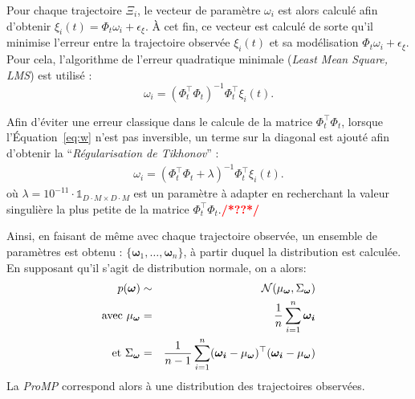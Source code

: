 \documentclass[utf8]{frontiersSCNS} %
\newcommand{\todo}[1]{\textcolor{red}{\textbf{/*#1*/}}}
\begin{document}
Pour chaque trajectoire $\Xi_i$, le vecteur de paramètre $\omega_i$ est alors calculé afin d'obtenir $\xi_i(t) = \Phi_t \omega_i + \epsilon_\xi$. À cet fin, ce vecteur est calculé de sorte qu'il minimise l'erreur entre la trajectoire observée $\xi_i(t)$ et sa modélisation $\Phi_t \omega_i + \epsilon_\xi$. Pour cela, l'algorithme de l'erreur quadratique minimale (\textit{Least Mean Square, LMS}) est utilisé :
\begin{equation} \label{eq:w}
\omega_i = (\Phi_t^\top\Phi_t)^{-1}\Phi_t^\top \xi_i(t).
\end{equation} 

Afin d'éviter une erreur classique dans le calcule de la matrice $\Phi_t^\top\Phi_t$, lorsque l'Équation~\ref{eq:w} n'est pas inversible, un terme sur la diagonal est ajouté afin d'obtenir la ``\textit{Régularisation de Tikhonov}'' :
\begin{eqnarray} \label{eq:wInvertible}
\omega_i = (\Phi_t^\top\Phi_t + \lambda)^{-1}\Phi_t^\top \xi_i(t).
\end{eqnarray} 
où $\lambda=10^{-11} \cdot \mathds{1}_{ D\cdot M \times D\cdot M} $ est un paramètre à adapter en recherchant la valeur singulière la plus petite de la matrice $\Phi_t^\top\Phi_t$.\todo{??}


Ainsi, en faisant de même avec chaque trajectoire observée, un ensemble de paramètres est obtenu : $\{\boldsymbol{\omega}_1,\ldots, \boldsymbol{\omega}_n\}$, à partir duquel la distribution est calculée. En supposant qu'il s'agit de distribution normale, on a alors:
\begin{eqnarray}
p(\boldsymbol{\omega}) & \sim & \mathcal{N}(\mu_{\boldsymbol{\omega}}, \Sigma_{\boldsymbol{\omega}})\\
\mathrm{avec }~\mu_{\boldsymbol{\omega}} & = & {1 \over n} \sum_{i=1}^n \boldsymbol{\omega_i} \\
\mathrm{et }~\Sigma_{\boldsymbol{\omega}} & = & {1 \over n-1} \sum_{i=1}^n (\boldsymbol{\omega_i} - \mu_{\boldsymbol{\omega}})^\top (\boldsymbol{\omega_i} - \mu_{\boldsymbol{\omega}})
\end{eqnarray}
La \textit{ProMP} correspond alors à une distribution des trajectoires observées. 
\end{document}
